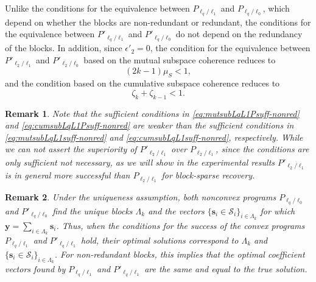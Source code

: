 \documentclass[10pt,twocolumn,twoside] {IEEEtran}
\newtheorem{remark}{Remark}
\begin{document}
{Unlike the conditions for the equivalence between $P_{\ell_q/\ell_1}$ and $P_{\ell_q/\ell_0}$, which depend on whether the blocks are non-redundant or redundant, the conditions for the equivalence between $P'_{\ell_q/\ell_1}$ and $P'_{\ell_q/\ell_0}$ do not depend on the redundancy of the blocks. In addition, since $\epsilon'_2 = 0$, the condition for the equivalence between $P'_{\ell_2/\ell_1}$ and $P'_{\ell_2/\ell_0}$ based on the mutual subspace coherence reduces to
\begin{equation}
\label{eq:mutsubLqL1Psuff-nonred}
(2k-1) \mu_S < 1,
\end{equation}
and the condition based on the cumulative subspace coherence reduces to
\begin{equation}
\label{eq:cumsubLqL1Psuff-nonred}
\zeta_{k} + \zeta_{k-1} < 1.
\end{equation}
\begin{remark}
Note that the sufficient conditions in \eqref{eq:mutsubLqL1Psuff-nonred} and \eqref{eq:cumsubLqL1Psuff-nonred} are weaker than the sufficient conditions in \eqref{eq:mutsubLqL1suff-nonred} and \eqref{eq:cumsubLqL1suff-nonred}, respectively. While we can not assert the superiority of $P'_{\ell_2/\ell_1}$ over $P_{\ell_2/\ell_1}$, since the conditions are only sufficient not necessary, as we will show in the experimental results $P'_{\ell_2/\ell_1}$ is in general more successful than $P_{\ell_2/\ell_1}$ for block-sparse recovery.
\end{remark}
\vspace{1mm} 
\begin{remark}
Under the uniqueness assumption, both nonconvex programs $P_{\ell_q/\ell_0}$ and $P'_{\ell_q/\ell_0}$ find the unique blocks $\Lambda_k$ and the vectors $\{ {\boldsymbol{s}}_i \in {\mathcal{S}}_i \}_{i \in \Lambda_k}$ for which ${\boldsymbol{y}} = \sum_{i \in \Lambda_k}{{\boldsymbol{s}}_i}$. Thus, when the conditions for the success of the convex programs $P_{\ell_q/\ell_1}$ and $P'_{\ell_q/\ell_1}$ hold, their optimal solutions correspond to $\Lambda_k$ and $\{ {\boldsymbol{s}}_i \in {\mathcal{S}}_i \}_{i \in \Lambda_k}$. For non-redundant blocks, this implies that the optimal coefficient vectors found by $P_{\ell_q/\ell_1}$ and $P'_{\ell_q/\ell_1}$ are the same and equal to the true solution. 
\end{remark}

}
\end{document}

